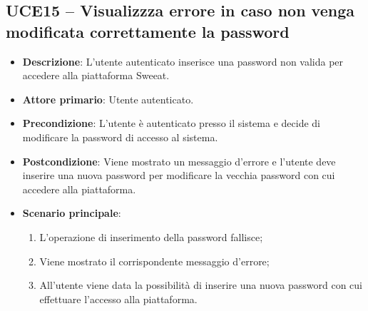 \subsection{UCE15 – Visualizzza errore in caso non venga modificata correttamente la password}
\begin{itemize}
\item \textbf{Descrizione}: L'utente autenticato inserisce una password non valida per accedere alla piattaforma Sweeat.
\item \textbf{Attore primario}: Utente autenticato.
\item \textbf{Precondizione}: L'utente è autenticato presso il sistema e decide di modificare la password di accesso al sistema.
\item \textbf{Postcondizione}: Viene mostrato un messaggio d'errore e l'utente deve inserire una nuova password per modificare la vecchia password con cui accedere alla piattaforma.

\item \textbf{Scenario principale}:
\begin{enumerate}
\item L'operazione di inserimento della password fallisce;
\item Viene mostrato il corrispondente messaggio d'errore;
\item All'utente viene data la possibilità di inserire una nuova password con cui effettuare l'accesso alla piattaforma.
\end{enumerate}
\end{itemize}